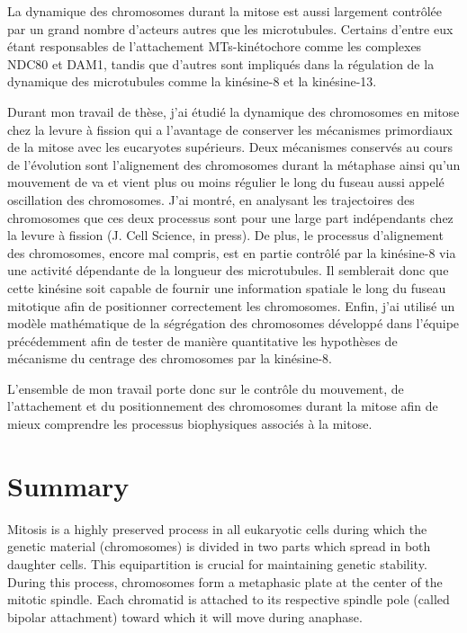 \documentclass[12pt,a4paper,twoside,openright]{book}
\begin{document}
La dynamique des chromosomes durant la mitose est aussi largement
contrôlée par un grand nombre d'acteurs autres que les microtubules.
Certains d'entre eux étant responsables de l'attachement MTs-kinétochore
comme les complexes NDC80 et DAM1, tandis que d'autres sont impliqués
dans la régulation de la dynamique des microtubules comme la kinésine-8
et la kinésine-13.

Durant mon travail de thèse, j'ai étudié la dynamique des chromosomes en
mitose chez la levure à fission qui a l'avantage de conserver les
mécanismes primordiaux de la mitose avec les eucaryotes supérieurs. Deux
mécanismes conservés au cours de l'évolution sont l'alignement des
chromosomes durant la métaphase ainsi qu'un mouvement de va et vient
plus ou moins régulier le long du fuseau aussi appelé oscillation des
chromosomes. J'ai montré, en analysant les trajectoires des chromosomes
que ces deux processus sont pour une large part indépendants chez la
levure à fission (J. Cell Science, in press). De plus, le processus
d'alignement des chromosomes, encore mal compris, est en partie contrôlé
par la kinésine-8 via une activité dépendante de la longueur des
microtubules. Il semblerait donc que cette kinésine soit capable de
fournir une information spatiale le long du fuseau mitotique afin de
positionner correctement les chromosomes. Enfin, j'ai utilisé un modèle
mathématique de la ségrégation des chromosomes développé dans l'équipe
précédemment afin de tester de manière quantitative les hypothèses de
mécanisme du centrage des chromosomes par la kinésine-8.

L'ensemble de mon travail porte donc sur le contrôle du mouvement, de
l'attachement et du positionnement des chromosomes durant la mitose afin
de mieux comprendre les processus biophysiques associés à la mitose.

\cleardoublepage
\section*{Summary}

Mitosis is a highly preserved process in all eukaryotic cells during
which the genetic material (chromosomes) is divided in two parts which
spread in both daughter cells. This equipartition is crucial for
maintaining genetic stability. During this process, chromosomes form a
metaphasic plate at the center of the mitotic spindle. Each chromatid is
attached to its respective spindle pole (called bipolar attachment)
toward which it will move during anaphase.
\end{document}
